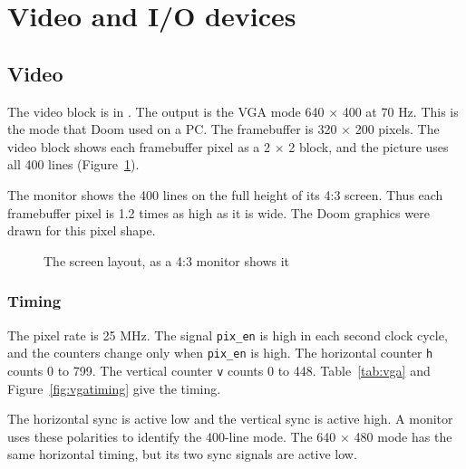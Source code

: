 \section{Video and I/O devices}
\label{sec:videoio}

\subsection{Video}

The video block is in . The output is the VGA mode 640 $\times$ 400 at 70 Hz. This is the mode that Doom used on a PC. The framebuffer is 320 $\times$ 200 pixels. The video block shows each framebuffer pixel as a 2 $\times$ 2 block, and the picture uses all 400 lines (Figure~\ref{fig:screen}).

The monitor shows the 400 lines on the full height of its 4:3 screen. Thus each framebuffer pixel is 1.2 times as high as it is wide. The Doom graphics were drawn for this pixel shape.

\begin{figure}[H]
  \centering
  \caption{The screen layout, as a 4:3 monitor shows it}
  \label{fig:screen}
\end{figure}

\subsubsection{Timing}
The pixel rate is 25 MHz. The signal \texttt{pix\_en} is high in each second clock cycle, and the counters change only when \texttt{pix\_en} is high. The horizontal counter \texttt{h} counts 0 to 799. The vertical counter \texttt{v} counts 0 to 448. Table~\ref{tab:vga} and Figure~\ref{fig:vgatiming} give the timing.

The horizontal sync is active low and the vertical sync is active high. A monitor uses these polarities to identify the 400-line mode. The 640 $\times$ 480 mode has the same horizontal timing, but its two sync signals are active low.

